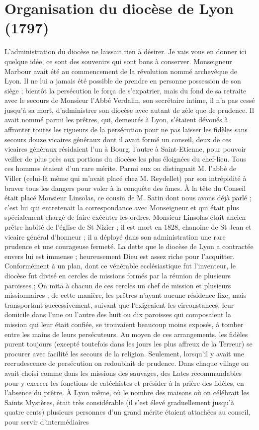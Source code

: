 \documentclass[11pt,a4paper]{report}
\begin{document}
\section*{Organisation du diocèse de Lyon (1797)}

L'administration du diocèse ne laissait rien à désirer. Je vais vous en donner ici quelque idée, ce sont des souvenirs qui sont bons à conserver. Monseigneur Marbour avait été au commencement de la révolution nommé archevêque de Lyon. Il ne lui a jamais été possible de prendre en personne possession de son siège ; bientôt la persécution le força de s'expatrier, mais du fond de sa retraite avec le secours de Monsieur l'Abbé Verdalin, son secrétaire intime, il n'a pas cessé jusqu'à sa mort, d'administrer son diocèse avec autant de zèle que de prudence. Il avait nommé parmi les prêtres, qui, demeurés à Lyon, s'étaient dévoués à affronter toutes les rigueurs de la persécution pour ne pas laisser les fidèles sans secours douze vicaires généraux dont il avait formé un conseil, deux de ces vicaires généraux résidaient l'un à Bourg, l'autre à Saint-Etienne, pour pouvoir veiller de plus près aux portions du diocèse les plus éloignées du chef-lieu. Tous ces hommes étaient d'un rare mérite. Parmi eux on distinguait M. l'abbé de Viller (celui-là même qui m'avait placé chez M. Reydellet) par son intrépidité à braver tous les dangers pour voler à la conquête des âmes. À la tête du Conseil était placé Monsieur Linsolas, ce cousin de M. Satin dont nous avons déjà parlé ; c'est lui qui entretenait la correspondance avec Monseigneur et qui était plus spécialement chargé de faire exécuter les ordres. Monsieur Linsolas était ancien prêtre habité de l'église de St Nizier ; il est mort en 1828, chanoine de St Jean et vicaire général d'honneur ; il a déployé dans son administration une rare prudence et une courageuse fermeté. La dette que le diocèse de Lyon a contractée envers lui est immense ; heureusement Dieu est assez riche pour l'acquitter. Conformément à un plan, dont ce vénérable ecclésiastique fut l'inventeur, le diocèse fut divisé en cercles de missions formés par la réunion de plusieurs paroisses ; On mita à chacun de ces cercles un chef de mission et plusieurs missionnaires ; de cette manière, les prêtres n'ayant aucune résidence fixe, mais transportant successivement, suivant que l'exigeaient les circonstances, leur domicile dans l'une ou l'autre des huit ou dix paroisses qui composaient la mission qui leur était confiée, se trouvaient beaucoup moins exposés, à tomber entre les mains de leurs persécuteurs. Au moyen de ces arrangements, les fidèles purent toujours (excepté toutefois dans les jours les plus affreux de la Terreur) se procurer avec facilité les secours de la religion. Seulement, lorsqu'il y avait une recrudescence de persécution on redoublait de prudence. Dans chaque village on avait choisi comme dans les missions des sauvages, des Lates recommandables pour y exercer les fonctions de catéchistes et présider à la prière des fidèles, en l'absence du prêtre. À Lyon même, où le nombre des maisons où on célébrait les Saints Mystères, était très considérable (il s'est élevé graduellement jusqu'à quatre cents) plusieurs personnes d'un grand mérite étaient attachées au conseil, pour servir d'intermédiaires 
\end{document}
